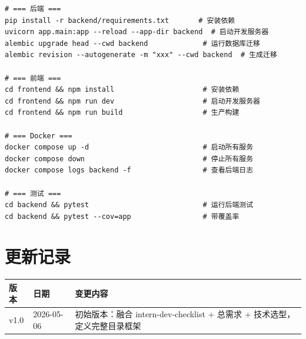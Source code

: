 \documentclass[11pt,a4paper]{article}
\begin{document}
\begin{lstlisting}[basicstyle=\ttfamily\footnotesize, frame=single]
# === 后端 ===
pip install -r backend/requirements.txt       # 安装依赖
uvicorn app.main:app --reload --app-dir backend  # 启动开发服务器
alembic upgrade head --cwd backend             # 运行数据库迁移
alembic revision --autogenerate -m "xxx" --cwd backend  # 生成迁移

# === 前端 ===
cd frontend && npm install                     # 安装依赖
cd frontend && npm run dev                     # 启动开发服务器
cd frontend && npm run build                   # 生产构建

# === Docker ===
docker compose up -d                           # 启动所有服务
docker compose down                            # 停止所有服务
docker compose logs backend -f                 # 查看后端日志

# === 测试 ===
cd backend && pytest                           # 运行后端测试
cd backend && pytest --cov=app                 # 带覆盖率
\end{lstlisting}

\section*{更新记录}

\begin{tabular}{lll}
\toprule
版本 & 日期 & 变更内容 \\
\midrule
v1.0 & 2026-05-06 & 初始版本：融合 intern-dev-checklist + 总需求 + 技术选型，定义完整目录框架 \\
\bottomrule
\end{tabular}
\end{document}
